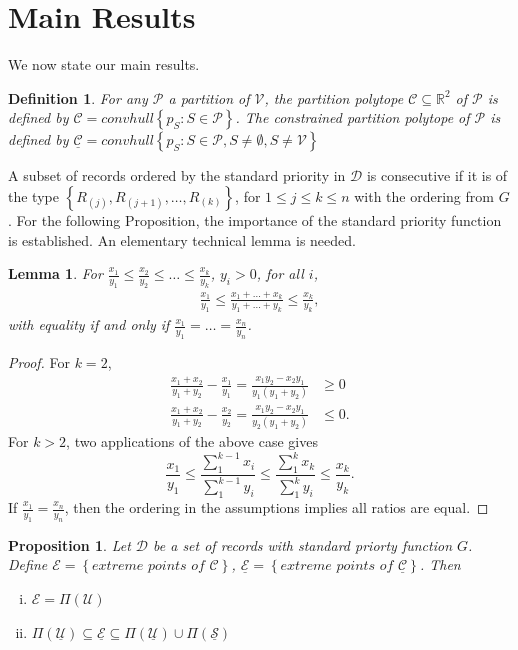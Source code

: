 \documentclass{article}
\newtheorem{definition}{Definition}
\newtheorem{lemma}{Lemma}
\newtheorem{prop}{Proposition}
\theoremstyle{case}
\begin{document}
\section{Main Results}
We now state our main results. 

\begin{definition}
For any $\mathcal{P}$ a partition of $\mathcal{V}$, the partition polytope $\mathcal{C} \subseteq \mathbb{R}^2$ of $\mathcal{P}$ is defined by $\mathcal{C} = convhull \left\lbrace p_S : S \in \mathcal{P}\right\rbrace$. The constrained partition polytope of $\mathcal{P}$ is defined by $\underline{\mathcal{C}} = convhull \left\lbrace p_S : S \in \mathcal{P}, S \neq \emptyset , S \neq \mathcal{V}\right\rbrace$
\end{definition}

A subset of records ordered by the standard priority in $\mathcal{D}$ is consecutive if it is of the type $\left\lbrace R_{(j)}, R_{(j+1)}, \dots, R_{(k)}\right\rbrace$, for $1 \leq j \leq k \leq n$ with the ordering from $G$. For the following Proposition, the importance of the standard priority function is established. An elementary technical lemma is needed.

\begin{lemma}
For $\frac{x_1}{y_1} \leq \frac{x_2}{y_2} \leq \dots \leq \frac{x_k}{y_k}$, $y_i > 0$, for all $i$,
\begin{align*}
\frac{x_1}{y_1} \leq \frac{x_1 + \dots + x_k}{y_1 + \dots + y_k} \leq \frac{x_k}{y_k},
\end{align*}
with equality if and only if $\frac{x_1}{y_1} = \dots = \frac{x_n}{y_n}$.
\end{lemma}
\begin{proof}
For $k=2$,
\begin{align*}
\frac{x_1+x_2}{y_1+y_2} - \frac{x_1}{y_1} = \frac{x_1y_2 - x_2y_1}{y_1\left( y_1 + y_2\right)} &\geq 0 \\
\frac{x_1 + x_2}{y_1 + y_2} - \frac{x_2}{y_2} = \frac{x_1y_2 - x_2y_1}{y_2\left( y_1 + y_2\right)} &\leq 0.
\end{align*}
For $k > 2$, two applications of the above case gives
\[
\frac{x_1}{y_1} \leq \frac{\sum_1^{k-1} x_i}{\sum_1^{k-1} y_i} \leq \frac{\sum_1^k x_k}{\sum_1^k y_i} \leq \frac{x_k}{y_k}. 
\]
If $\frac{x_1}{y_1} = \frac{x_n}{y_n}$, then the ordering in the assumptions implies all ratios are equal. 
\end{proof}

\begin{prop} \label{prop0}
Let $\mathcal{D}$ be a set of records with standard priorty function $G$. Define $\mathcal{E} = \left\lbrace \textit{extreme points of } \mathcal{C}\right\rbrace$, $\underline{\mathcal{E}} = \left\lbrace \textit{extreme points of } \underline{\mathcal{C}}\right\rbrace$. Then
\begin{enumerate}[(i)]
	\item $\mathcal{E} = \Pi\left( \mathcal{U}\right)$
	\item $\Pi\left( \mathcal{\underline{U}}\right) \subseteq \underline{\mathcal{E}} \subseteq \Pi\left( \mathcal{\underline{U}}\right) \cup \Pi\left( \mathcal{\underline{S}}\right)$
\end{enumerate}
\end{prop}
\end{document}
